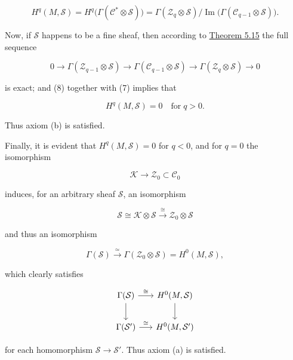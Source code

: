 \begin{equation}
\tag{7}\label{eq:5.20:7}
H^{q}(M,\mathcal{S})=H^{q}\big(\Gamma(\mathcal{C}^{*}\otimes\mathcal{S})\big)=\Gamma(\mathcal{Z}_{q}\otimes\mathcal{S})/\operatorname{Im}\big(\Gamma(\mathcal{C}_{q-1}\otimes\mathcal{S})\big).
\end{equation}

Now, if $\mathcal{S}$ happens to be a fine sheaf, then according to \hyperref[thm:5.15]{Theorem 5.15} the full sequence

\begin{equation}
\tag{8}\label{eq:5.20:8}
0\to\Gamma(\mathcal{Z}_{q-1}\otimes\mathcal{S})\to\Gamma(\mathcal{C}_{q-1}\otimes\mathcal{S})\to\Gamma(\mathcal{Z}_{q}\otimes\mathcal{S})\to0
\end{equation}

is exact; and (8) together with (7) implies that

\[
H^{q}(M,\mathcal{S})=0\quad\mathrm{for}\;q>0.
\]

Thus axiom (b) is satisfied.

Finally, it is evident that $H^{q}(M,\mathcal{S}) = 0$ for $q < 0$, and for $q = 0$ the isomorphism

\begin{equation}
\tag{9}\label{eq:5.20:9}
\mathcal{K}\to\mathcal{Z}_{0}\subset\mathcal{C}_{0}
\end{equation}

induces, for an arbitrary sheaf $\mathcal{S}$, an isomorphism

\begin{equation}
\tag{10}\label{eq:5.20:10}
\mathcal{S}\cong\mathcal{K}\otimes\mathcal{S}\xrightarrow{\cong}\mathcal{Z}_{0}\otimes\mathcal{S}
\end{equation}

and thus an isomorphism

\[
\Gamma(\mathcal{S})\xrightarrow{\simeq}\Gamma(\mathcal{Z}_{0}\otimes\mathcal{S})=H^{0}(M,\mathcal{S}),
\]

which clearly satisfies

\[
\begin{tikzcd}[ampersand replacement=\&, column sep=1.6em,row sep=2em]
\Gamma(\mathcal{S}) \arrow[r ,"{\cong}"] \arrow[d] \&  H^{0}(M,\mathcal{S}) \arrow[d] \\
\Gamma(\mathcal{S}^{\prime}) \arrow[r ,"{\cong}"] \&  H^{0}(M,\mathcal{S}^{\prime})
\end{tikzcd}
\]

for each homomorphism  $ \mathcal{S} \to \mathcal{S}' $. Thus axiom (a) is satisfied.

